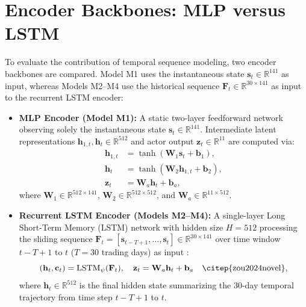\section{Encoder Backbones: MLP versus LSTM}
To evaluate the contribution of temporal sequence modeling, two encoder backbones are compared. Model M1 uses the instantaneous state $\mathbf{s}_t \in \mathbb{R}^{141}$ as input, whereas Models M2--M4 use the historical sequence $\mathbf{F}_t \in \mathbb{R}^{30 \times 141}$ as input to the recurrent LSTM encoder:
\begin{itemize}
    \item \textbf{MLP Encoder (Model M1):} A static two-layer feedforward network observing solely the instantaneous state $\mathbf{s}_t \in \mathbb{R}^{141}$. Intermediate latent representations $\mathbf{h}_{1,t}, \mathbf{h}_t \in \mathbb{R}^{512}$ and actor output $\mathbf{z}_t \in \mathbb{R}^{11}$ are computed via:
    \begin{align}
    \mathbf{h}_{1,t} &= \tanh(\mathbf{W}_1 \mathbf{s}_t + \mathbf{b}_1), \\
    \mathbf{h}_t &= \tanh(\mathbf{W}_2 \mathbf{h}_{1,t} + \mathbf{b}_2), \\
    \mathbf{z}_t &= \mathbf{W}_a \mathbf{h}_t + \mathbf{b}_a,
    \end{align}
    where $\mathbf{W}_1 \in \mathbb{R}^{512 \times 141}$, $\mathbf{W}_2 \in \mathbb{R}^{512 \times 512}$, and $\mathbf{W}_a \in \mathbb{R}^{11 \times 512}$.
    
    \item \textbf{Recurrent LSTM Encoder (Models M2--M4):} A single-layer Long Short-Term Memory (LSTM) network with hidden size $H = 512$ processing the sliding sequence $\mathbf{F}_t = [\mathbf{s}_{t-T+1}, \dots, \mathbf{s}_t] \in \mathbb{R}^{30 \times 141}$ over time window $t-T+1$ to $t$ ($T = 30$ trading days) as input \citep{zou2024novel}:
    \begin{equation}
    (\mathbf{h}_t, \mathbf{c}_t) = \text{LSTM}_\psi(\mathbf{F}_t), \quad \mathbf{z}_t = \mathbf{W}_a \mathbf{h}_t + \mathbf{b}_a \quad \text{\citep{zou2024novel}},
    \end{equation}
    where $\mathbf{h}_t \in \mathbb{R}^{512}$ is the final hidden state summarizing the 30-day temporal trajectory from time step $t-T+1$ to $t$.
    

\end{itemize}
